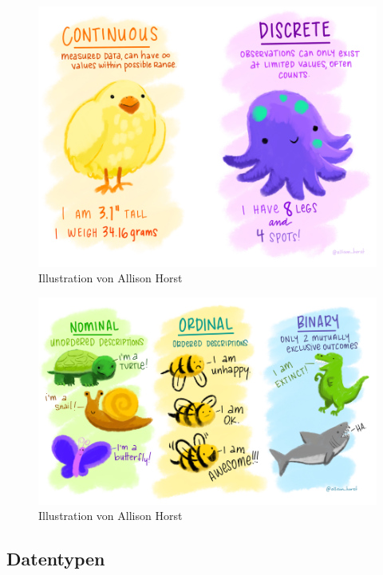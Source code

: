 \documentclass[
]{article}
\begin{document}
\begin{figure}

{\centering \includegraphics[width=1\linewidth]{images/018} 

}

\caption{Illustration von Allison Horst}\label{fig:unnamed-chunk-39}
\end{figure}

\begin{figure}

{\centering \includegraphics[width=1\linewidth]{images/019} 

}

\caption{Illustration von Allison Horst}\label{fig:unnamed-chunk-40}
\end{figure}

\hypertarget{datentypen}{%
\subsection{Datentypen}\label{datentypen}}
\end{document}
